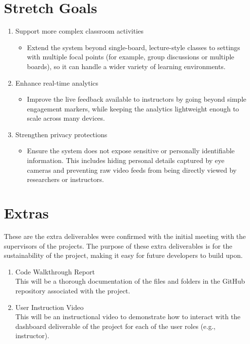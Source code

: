 \documentclass{article}
\begin{document}
\section{Stretch Goals}

\begin{enumerate}
    \item Support more complex classroom activities
    \begin{itemize}
        \item Extend the system beyond single-board, lecture-style classes to settings with multiple focal points (for example, group discussions or multiple boards), so it can handle a wider variety of learning environments.
    \end{itemize}

    \item Enhance real-time analytics
    \begin{itemize}
        \item Improve the live feedback available to instructors by going beyond simple engagement markers, while keeping the analytics lightweight enough to scale across many devices.
    \end{itemize}

    \item Strengthen privacy protections
    \begin{itemize}
        \item Ensure the system does not expose sensitive or personally identifiable information. This includes hiding personal details captured by eye cameras and preventing raw video feeds from being directly viewed by researchers or instructors.
    \end{itemize}
\end{enumerate}

\section{Extras}
These are the extra deliverables were confirmed with the initial meeting with the supervisors of the projects. 
The purpose of these extra deliverables is for the sustainability of the project, making it easy for future developers to build upon. 

\begin{enumerate}
    \item Code Walkthrough Report \\
    This will be a thorough documentation of the files and folders in the GitHub repository associated with the project. 

    \item User Instruction Video \\
    This will be an instructional video to demonstrate how to interact with the dashboard deliverable of the project for each of the user roles (e.g., instructor). 
\end{enumerate}
\end{document}

